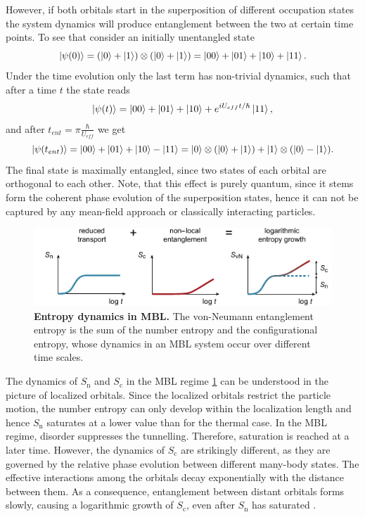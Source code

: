 However, if both orbitals start in the superposition of different occupation states the system dynamics will produce entanglement between the two at certain time points. To see that consider an initially unentangled state 
\begin{equation}
\left|\psi(0)\right\rangle = (\left|0\right\rangle+\left|1\right\rangle)\otimes(\left|0\right\rangle+\left|1\right\rangle) = \left|00\right\rangle+\left|01\right\rangle+\left|10\right\rangle+\left|11\right\rangle.
\end{equation}
Under the time evolution only the last term has non-trivial dynamics, such that after a time $t$ the state reads
\begin{equation}
\left|\psi(t)\right\rangle = \left|00\right\rangle+\left|01\right\rangle+\left|10\right\rangle+e^{iU_{eff}t/\hbar}\left|11\right\rangle,
\end{equation}
and after $t_{ent}=\pi \frac{\hbar}{U_{eff}}$ we get
\begin{equation}
\left|\psi(t_{ent})\right\rangle = \left|00\right\rangle+\left|01\right\rangle+\left|10\right\rangle-\left|11\right\rangle = \left|0\right\rangle\otimes(\left|0\right\rangle+\left|1\right\rangle)+\left|1\right\rangle\otimes(\left|0\right\rangle -\left|1\right\rangle).
\end{equation}
The final state is maximally entangled, since two states of each orbital are orthogonal to each other. Note, that this effect is purely quantum, since it stems form the coherent phase evolution of the superposition states, hence it can not be captured by any mean-field approach or classically interacting particles.

\begin{figure}[t]
	\centering
	\includegraphics[scale=1.6]{figures/MBL_ent_split.pdf}
	\caption{{\bf Entropy dynamics in MBL.} The von-Neumann entanglement entropy is the sum of the number entropy and the configurational entropy, whose dynamics in an MBL system occur over different time scales.}
	\label{fig:MBL_ent_concept}
\end{figure}

The dynamics of $S_\text{n}$ and $S_\text{c}$ in the MBL regime \ref{fig:MBL_ent_concept} can be understood in the picture of localized orbitals. Since the localized orbitals restrict the particle motion, the number entropy can only develop within the localization length and hence $S_\text{n}$ saturates at a lower value than for the thermal case. In the MBL regime, disorder suppresses the tunnelling. Therefore, saturation is reached at a later time. However, the dynamics of $S_\text{c}$ are strikingly different, as they are governed by the relative phase evolution between different many-body states.  The effective interactions among the orbitals decay exponentially with the distance between them. As a consequence, entanglement between distant orbitals forms slowly, causing a logarithmic growth of $S_\text{c}$, even after $S_\text{n}$ has saturated \cite{Serbyn2013, Serbyn2013b, Huse2014, Znidaric2008, Bardarson2012}.

